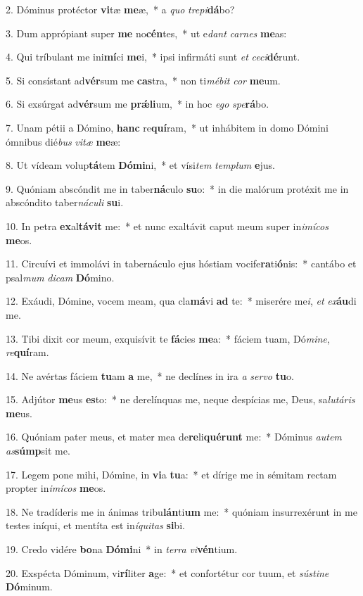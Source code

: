 2. Dóminus protéctor \textbf{vi}tæ \textbf{me}æ,~*  a \textit{quo} \textit{tre}\textit{pi}\textbf{dá}bo?\

3. Dum apprópiant super \textbf{me} no\textbf{cén}tes,~*  ut e\textit{dant} \textit{car}\textit{nes} \textbf{me}as:\

4. Qui tríbulant me ini\textbf{mí}ci \textbf{me}i,~*  ipsi infirmáti sunt \textit{et} \textit{ce}\textit{ci}\textbf{dé}runt.\

5. Si consístant ad\textbf{vér}sum me \textbf{cas}tra,~*  non ti\textit{mé}\textit{bit} \textit{cor} \textbf{me}um.\

6. Si exsúrgat ad\textbf{vér}sum me \textbf{prǽ}\textbf{li}um,~*  in hoc \textit{e}\textit{go} \textit{spe}\textbf{rá}bo.\

7. Unam pétii a Dómino, \textbf{hanc} re\textbf{quí}ram,~*  ut inhábitem in domo Dómini ómnibus dié\textit{bus} \textit{vi}\textit{tæ} \textbf{me}æ:\

8. Ut vídeam volup\textbf{tá}tem \textbf{Dó}\textbf{mi}ni,~*  et vísi\textit{tem} \textit{tem}\textit{plum} \textbf{e}jus.\

9. Quóniam abscóndit me in taber\textbf{ná}culo \textbf{su}o:~*  in die malórum protéxit me in abscóndito taber\textit{ná}\textit{cu}\textit{li} \textbf{su}i.\

10. In petra \textbf{ex}al\textbf{tá}\textbf{vit} me:~*  et nunc exaltávit caput meum super in\textit{i}\textit{mí}\textit{cos} \textbf{me}os.\

11. Circuívi et immolávi in tabernáculo ejus hóstiam vocife\textbf{ra}ti\textbf{ó}nis:~*  cantábo et psal\textit{mum} \textit{di}\textit{cam} \textbf{Dó}mino.\

12. Exáudi, Dómine, vocem meam, qua cla\textbf{má}vi \textbf{ad} te:~*  miserére me\textit{i}, \textit{et} \textit{ex}\textbf{áu}di me.\

13. Tibi dixit cor meum, exquisívit te \textbf{fá}cies \textbf{me}a:~*  fáciem tuam, Dó\textit{mi}\textit{ne}, \textit{re}\textbf{quí}ram.\

14. Ne avértas fáciem \textbf{tu}am \textbf{a} me,~*  ne declínes in ira \textit{a} \textit{ser}\textit{vo} \textbf{tu}o.\

15. Adjútor \textbf{me}us \textbf{es}to:~*  ne derelínquas me, neque despícias me, Deus, sa\textit{lu}\textit{tá}\textit{ris} \textbf{me}us.\

16. Quóniam pater meus, et mater mea de\textbf{re}li\textbf{qué}\textbf{runt} me:~*  Dóminus \textit{au}\textit{tem} \textit{as}\textbf{súmp}sit me.\

17. Legem pone mihi, Dómine, in \textbf{vi}a \textbf{tu}a:~*  et dírige me in sémitam rectam propter in\textit{i}\textit{mí}\textit{cos} \textbf{me}os.\

18. Ne tradíderis me in ánimas tribu\textbf{lán}ti\textbf{um} me:~*  quóniam insurrexérunt in me testes iníqui, et mentíta est in\textit{í}\textit{qui}\textit{tas} \textbf{si}bi.\

19. Credo vidére \textbf{bo}na \textbf{Dó}\textbf{mi}ni~*  in \textit{ter}\textit{ra} \textit{vi}\textbf{vén}tium.\

20. Exspécta Dóminum, vi\textbf{rí}liter \textbf{a}ge:~*  et confortétur cor tuum, et \textit{sús}\textit{ti}\textit{ne} \textbf{Dó}minum.\

